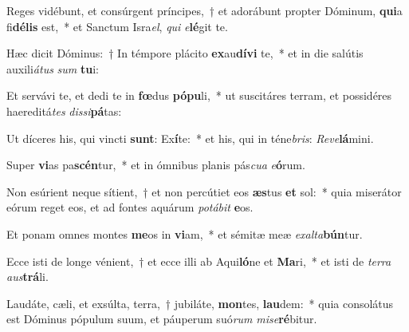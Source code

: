 \item Reges vidébunt, et consúrgent príncipes,~† et adorábunt propter Dóminum, \textbf{qui}a fi\textbf{dé}\textbf{lis} est,~* et Sanctum Isra\textit{el}, \textit{qui} \textit{e}\textbf{lé}git te.
\item Hæc dicit Dóminus:~† In témpore plácito \textbf{ex}au\textbf{dí}\textbf{vi} te,~* et in die salútis auxili\textit{á}\textit{tus} \textit{sum} \textbf{tu}i:
\item Et servávi te, et dedi te in \textbf{fœ}dus \textbf{pó}\textbf{pu}li,~* ut suscitáres terram, et possidéres haereditá\textit{tes} \textit{dis}\textit{si}\textbf{pá}tas:
\item Ut díceres his, qui vincti \textbf{sunt}: Ex\textbf{í}te:~* et his, qui in téne\textit{bris}: \textit{Re}\textit{ve}\textbf{lá}mini.
\item Super \textbf{vi}as pa\textbf{scén}tur,~* et in ómnibus planis pás\textit{cu}\textit{a} \textit{e}\textbf{ó}rum.
\item Non esúrient neque sítient,~† et non percútiet eos \textbf{æs}tus \textbf{et} sol:~* quia miserátor eórum reget eos, et ad fontes aquárum \textit{po}\textit{tá}\textit{bit} \textbf{e}os.
\item Et ponam omnes montes \textbf{me}os in \textbf{vi}am,~* et sémitæ meæ \textit{ex}\textit{al}\textit{ta}\textbf{bún}tur.
\item Ecce isti de longe vénient,~† et ecce illi ab Aqui\textbf{ló}ne et \textbf{Ma}ri,~* et isti de \textit{ter}\textit{ra} \textit{aus}\textbf{trá}li.
\item Laudáte, cæli, et exsúlta, terra,~† jubiláte, \textbf{mon}tes, \textbf{lau}dem:~* quia consolátus est Dóminus pópulum suum, et páuperum suó\textit{rum} \textit{mi}\textit{se}\textbf{ré}bitur.
